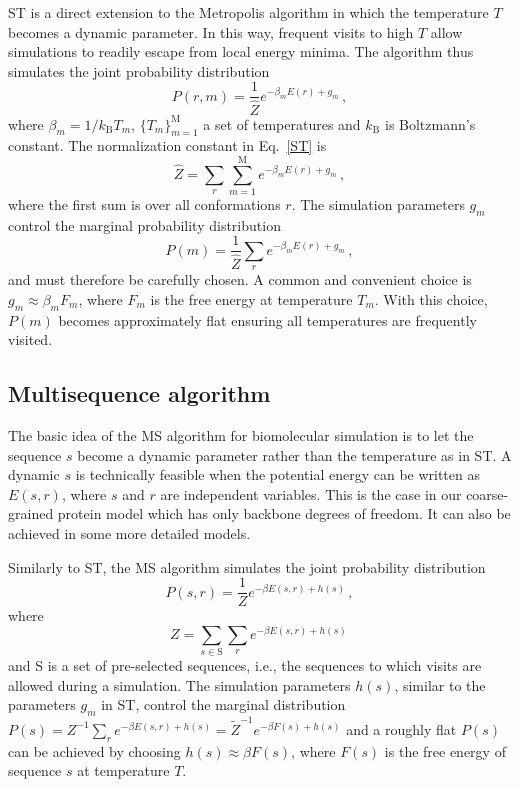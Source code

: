 \documentclass[
aip,
rsi,%
amsmath,amssymb,
reprint,%
]{revtex4-1}
\newcommand	 {\sbar}	{{s}}
\newcommand	 {\rbar}	{{r}}
\begin{document}
ST is a direct extension to the Metropolis algorithm in which the temperature $T$ becomes a dynamic parameter. In this way, frequent visits to high $T$ allow simulations to readily escape from local energy minima. The algorithm thus simulates the joint probability distribution 
\begin{equation}
P(\rbar,m) =\dfrac{1}{\hat{Z}} e^{-\beta_m E(\rbar) + g_m}\,,
\label{ST}
\end{equation}
where  $\beta_m=1/k_\mathrm{B} T_m$, $\{T_m\}_{m=1}^\mathrm{M}$ a set of temperatures and $k_\mathrm{B}$ is Boltzmann's constant. The normalization constant in Eq.~\ref{ST} is  
\begin{equation}
\hat{Z} = \sum_r \sum_{m=1}^{\mathrm{M}}e^{-\beta_m E(\rbar) + g_m}\,,
\end{equation}
where the first sum is over all conformations $\rbar$. The simulation parameters $g_m$ control the marginal probability distribution
\begin{equation}
P(m) = \frac{1}{\hat{Z}}\sum_r e^{-\beta_m E(\rbar) + g_m} \,,
\end{equation}
and must therefore be carefully chosen. A common and convenient choice is $g_m\approx \beta_m F_m$, where $F_m$ is the free energy at temperature $T_m$. With this choice, $P(m)$ becomes approximately flat ensuring all temperatures are frequently visited. 

\subsection{Multisequence algorithm}
 
The basic idea of the MS algorithm for biomolecular simulation is to let the sequence $\sbar$ become a dynamic parameter rather than the temperature as in ST. A dynamic $\sbar$ is technically feasible when the potential energy can be written as $E(\sbar,\rbar)$, where $\sbar$ and $\rbar$ are independent variables. This is the case in our coarse-grained protein model which has only backbone degrees of freedom. It can also be achieved in some more detailed models.~\cite{Bhattacherjee2013,Wallin2017} 

Similarly to ST, the MS algorithm simulates the joint probability distribution
\begin{equation}
P(\sbar,\rbar) =\dfrac{1}{Z}e^{-\beta E(\sbar,\rbar) + h(\sbar)}\,, 
\label{MS}
\end{equation}
where  {\color{red}
\begin{equation}
Z = \sum_{\sbar\in\mathrm{S}}\sum_{\rbar} e^{-\beta E(\sbar,\rbar)+ h(\sbar)}\,
\label{eq:ZMS}
\end{equation}
and S is a set of pre-selected sequences, i.e., the sequences to which visits are allowed during a simulation.} The simulation parameters $h(\sbar)$, similar to the parameters $g_m$ in ST, control the marginal distribution $P(\sbar)=Z^{-1}\sum_{\rbar} e^{-\beta E(\sbar,\rbar)+ h(\sbar)} = \tilde{Z}^{-1}e^{-\beta F(\sbar)+ h(\sbar)}$ and a roughly flat $P(\sbar)$ can be achieved by choosing $h(\sbar) \approx \beta F(\sbar)$, where $F(\sbar)$ is the free energy of sequence $\sbar$ at temperature $T$. 
\end{document}
